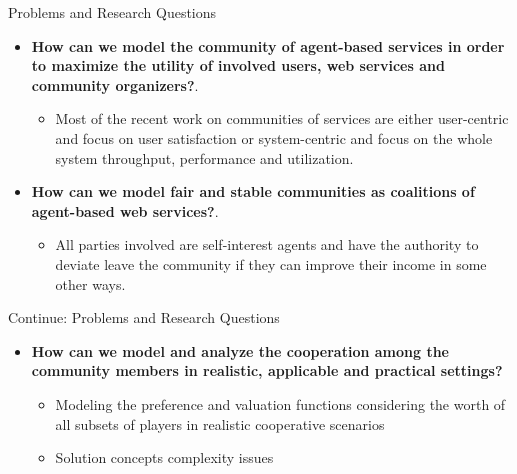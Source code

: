\documentclass{beamer}
\begin{document}
\begin{frame}{Problems and Research Questions}

\begin{itemize}
    \item \textbf{How can we model the
        community of agent-based services in order to maximize the utility
        of involved users, web services and community organizers?}.
        \begin{itemize}
            \item Most of the recent work on communities of
            services are either user-centric and focus on user satisfaction
            or system-centric and focus on the whole system throughput, performance and utilization.
        \end{itemize}       
        
    
    \item \textbf{How can we model fair and stable communities as coalitions
        of agent-based web services?}.
        \begin{itemize}
            \item All parties involved are self-interest agents and have the authority to deviate leave the community if they can improve their income in some other ways.
        \end{itemize}

\end{itemize}

\end{frame}

\begin{frame}{Continue: Problems and Research Questions}
 \begin{itemize}
   \item \textbf{How can we model and analyze the cooperation
        among the community members in realistic, applicable and practical
        settings?}
        \begin{itemize}
            \item Modeling the preference and valuation functions considering the worth of all subsets of players in realistic cooperative scenarios
            \item Solution concepts complexity issues
        \end{itemize}

\end{itemize}
\end{frame}
\end{document}
